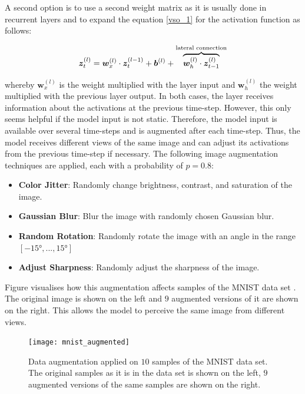 A second option is to use a second weight matrix as it is usually done in recurrent layers and to expand the equation \eqref{vso_1} for the activation function as follows:

\begin{equation}\eqlbl{vso_13}
		\boldsymbol{z}^{(l)}_t =  \boldsymbol{w}_x^{(l)} \cdot \boldsymbol{z}^{(l-1)}_t + \boldsymbol{b}^{(l)} + \overbrace{\boldsymbol{w}_h^{(l)} \cdot \boldsymbol{z}^{(l)}_{t-1} }^{\text{lateral connection}}
\end{equation}

whereby $\boldsymbol{w}_x^{(l)}$ is the weight multiplied with the layer input and $\boldsymbol{w}_h^{(l)}$ the weight multiplied with the previous layer output. In both cases, the layer receives information about the activations at the previous time-step.
However, this only seems helpful if the model input is not static. Therefore, the model input is available over several time-steps and is augmented after each time-step. Thus, the model receives different views of the same image and can adjust its activations from the previous time-step if necessary. The following image augmentation techniques are applied, each with a probability of $p=0.8$:

\begin{itemize}
	\item \textbf{Color Jitter}: Randomly change brightness, contrast, and saturation of the image.
	\item \textbf{Gaussian Blur}: Blur the image with randomly chosen Gaussian blur.
	\item \textbf{Random Rotation}: Randomly rotate the image with an angle in the range $[-15°, ..., 15°]$
	\item \textbf{Adjust Sharpness}: Randomly adjust the sharpness of the image.
\end{itemize}

Figure  visualises how this augmentation affects samples of the MNIST data set \cite{Lecun_Bottou_Bengio_Haffner_1998}. The original image is shown on the left and $9$ augmented versions of it are shown on the right. This allows the model to perceive the same image from different views.

\begin{figure}[h]
    \centering
    \texttt{[image: mnist\_augmented]}
    \caption[Data augmentation applied on $10$ samples of the MNIST data set]{Data augmentation applied on $10$ samples of the MNIST data set. The original samples as it is in the data set is shown on the left, $9$ augmented versions of the same samples are shown on the right.}
\end{figure}


